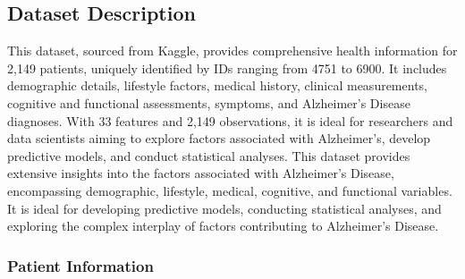 \documentclass[a4paper,12pt]{report}
\begin{document}
\subsection{Dataset Description}
This dataset, sourced from Kaggle, provides comprehensive health information for 2,149 patients, uniquely identified by IDs ranging from 4751 to 6900. It includes demographic details, lifestyle factors, medical history, clinical measurements, cognitive and functional assessments, symptoms, and Alzheimer's Disease diagnoses. With 33 features and 2,149 observations, it is ideal for researchers and data scientists aiming to explore factors associated with Alzheimer's, develop predictive models, and conduct statistical analyses.
\newline This dataset provides extensive insights into the factors associated with Alzheimer's Disease, encompassing demographic, lifestyle, medical, cognitive, and functional variables. It is ideal for developing predictive models, conducting statistical analyses, and exploring the complex interplay of factors contributing to Alzheimer's Disease.

\subsubsection{Patient Information}
\end{document}
